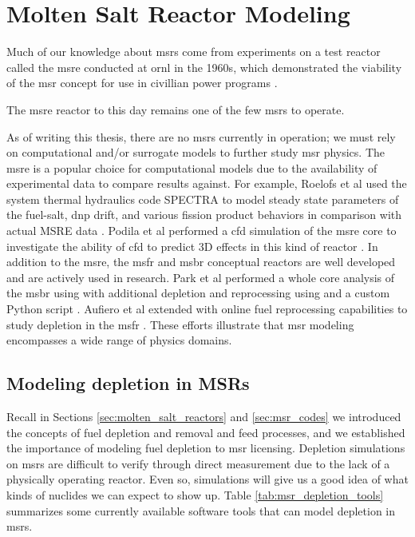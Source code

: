 \chapter{Molten Salt Reactor Modeling}%
\label{ch:chapter2}
Much of our knowledge about \Gls{msr}s come from experiments on a test reactor
called the \Gls{msre} conducted at \Gls{ornl} in the 1960s, which demonstrated
the viability of the \Gls{msr} concept for use in civillian power programs
\cite{haubenreich_experience_1970} \cite{rosenthal_history_1970}.

The \Gls{msre} reactor to this day remains one of the few \Gls{msr}s to operate.

As of writing this thesis, there are no \Gls{msr}s currently in operation; we
must rely on computational and/or surrogate models to further study \Gls{msr}
physics. The \Gls{msre} is a popular choice for computational models due to the
availability of experimental data to compare results against. For example,
Roelofs et al used the system thermal hydraulics code SPECTRA to model steady
state parameters of the fuel-salt, \Gls{dnp} drift, and various fission product
behaviors in comparison with actual MSRE data \cite{roelofs_molten_2021}.
Podila et al performed a \Gls{cfd} simulation of the \Gls{msre} core to
investigate the ability of \Gls{cfd} to predict 3D effects in this kind of
reactor \cite{podila_cfd_2019}. 
In addition to the \Gls{msre}, the \Gls{msfr} \cite{merle-lucotte_launching_2011}
and \Gls{msbr} \cite{robertson_conceptual_1971} conceptual reactors are well
developed and are actively used in research. Park et al performed a whole core
analysis of the \Gls{msbr} using \MCNPSIX with additional depletion and
reprocessing using \CINDERNINETY and a custom Python script \cite{park_whole_2015}.
Aufiero et al extended \SerpentTWO with online fuel reprocessing capabilities to
study depletion in the \Gls{msfr} \cite{aufiero_extended_2013}. These efforts
illustrate that \Gls{msr} modeling encompasses a wide range of physics domains.

\section{Modeling depletion in MSRs} Recall in Sections
\ref{sec:molten_salt_reactors} and \ref{sec:msr_codes} we introduced the
concepts of fuel depletion and removal and feed processes, and we established
the importance of modeling fuel depletion to \Gls{msr} licensing. Depletion
simulations on \Gls{msr}s are difficult to verify through direct
measurement due to the lack of a physically operating reactor. Even so,
simulations will give us a good idea of what kinds of nuclides we can expect to
show up. Table \ref{tab:msr_depletion_tools} summarizes some currently available
software tools that can model depletion in \Gls{msr}s. 

